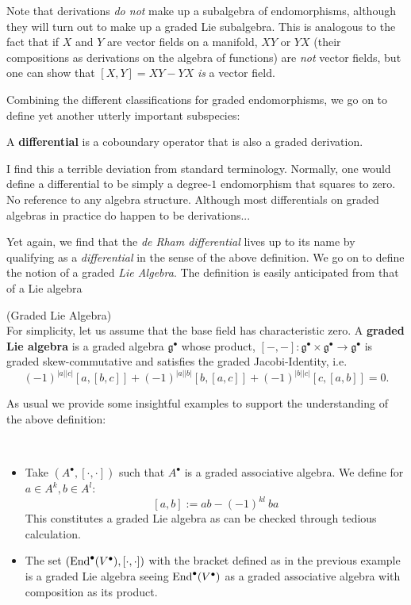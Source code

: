 \begin{rem}
  Note that derivations \emph{do not} make up a subalgebra of endomorphisms, although they will turn out to make up a graded Lie subalgebra. This is analogous to the fact that if $X$ and $Y$ are vector fields on a manifold, $XY$ or $YX$ (their compositions as derivations on the algebra of functions) are \emph{not} vector fields, but one can show that $[X,Y]=XY-YX$ \emph{is} a vector field.
\end{rem}

Combining the different classifications for graded endomorphisms, we go on to define yet another utterly important subspecies:

\begin{definition}
  A \textbf{differential} is a coboundary operator that is also a graded derivation.
\end{definition}

\begin{mdframed}I find this a terrible deviation from standard terminology. Normally, one would define a differential to be simply a degree-$1$ endomorphism that squares to zero. No reference to any algebra structure. Although most differentials on graded algebras in practice do happen to be derivations... \end{mdframed}

Yet again, we find that the \emph{de Rham differential} lives up to its name by qualifying as a \emph{differential} in the sense of the above definition. We go on to define the notion of a graded \emph{Lie Algebra}. The definition is easily anticipated from that of a Lie algebra

\begin{definition} (Graded Lie Algebra)\\
  For simplicity, let us assume that the base field has characteristic zero. A \textbf{graded Lie algebra} is a graded algebra $\mathfrak{g}^\bullet$ whose product, $[-,-]\colon \mathfrak{g}^\bullet\times\mathfrak{g}^\bullet\rightarrow\mathfrak{g}^\bullet$ is graded skew-commutative and satisfies the graded Jacobi-Identity, i.e.
  $$
  (-1)^{|a||c|}[a,[b,c]]+(-1)^{|a||b|}[b,[a,c]]+(-1)^{|b||c|}[c,[a,b]]=0.
  $$
\end{definition}

As usual we provide some insightful examples to support the understanding of the above definition:

\begin{example}~
\begin{itemize}
  \item Take $(A^\bullet, [\cdot , \cdot ])$ such that $A^\bullet$ is a graded associative algebra. We define for $a \in A^k,b \in A^l$:
  $$ [a,b] := ab-(-1)^{kl} \ ba$$ This constitutes a graded Lie algebra as can be checked through tedious calculation.

  \item The set $(\operatorname{End}^\bullet(V^\bullet), [\cdot,\cdot])$ with the bracket defined as in the previous example is a graded Lie algebra seeing $\operatorname{End}^\bullet(V^\bullet)$ as a graded associative algebra with composition as its product. 
\end{itemize}
\end{example}

